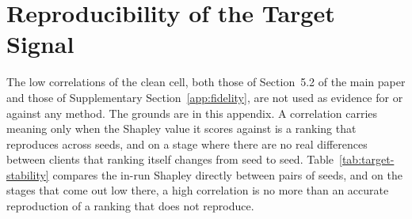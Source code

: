 \documentclass[letterpaper]{article} %
\theoremstyle{plain}
\begin{document}
\section{Reproducibility of the Target Signal}
\label{app:signal}

The low correlations of the clean cell, both those of Section~5.2 of the main
paper and those of Supplementary Section~\ref{app:fidelity}, are not used as
evidence for or against any method. The grounds are in
this appendix. A correlation carries meaning only when the Shapley value it
scores against is a ranking that reproduces across seeds, and on a stage
where there are no real differences between clients that ranking itself
changes from seed to seed. Table~\ref{tab:target-stability} compares the
in-run Shapley directly between pairs of seeds, and on the stages that come
out low there, a high correlation is no more than an accurate reproduction of
a ranking that does not reproduce.
\end{document}
